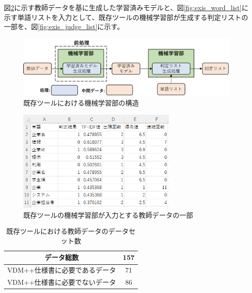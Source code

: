 図\ref{fig:exis_teach}に示す教師データを基に生成した学習済みモデルと、図\ref{fig:exis_word_list}に示す単語リストを入力として、既存ツールの機械学習部が生成する判定リストの一部を、図\ref{fig:exis_judge_list}に示す。

\begin{figure}[p]
    \begin{center}
        \includegraphics[width=1.0\columnwidth]{image/exis_machine_structure.png}
        \caption{既存ツールにおける機械学習部の構造}
        \label{fig:exis_machine_structure}
    \end{center}
\end{figure}

\begin{figure}[p]
    \begin{center}
        \includegraphics[width=300]{image/exis_teach.png}
        \caption{既存ツールの機械学習部が入力とする教師データの一部}
        \label{fig:exis_teach}
    \end{center}
\end{figure}

\begin{table}[p]
    \begin{center}
      \caption{既存ツールにおける教師データのデータセット数}
      \label{table:exis_data_set}
      \begin{tabular}{c|c}
        データ総数　& 157\\
        \hline
        \hline
        VDM++仕様書に必要であるデータ    & 71\\ \hline
        VDM++仕様書に必要でないデータ & 86\\ \hline
      \end{tabular}
    \end{center}
  \end{table}

